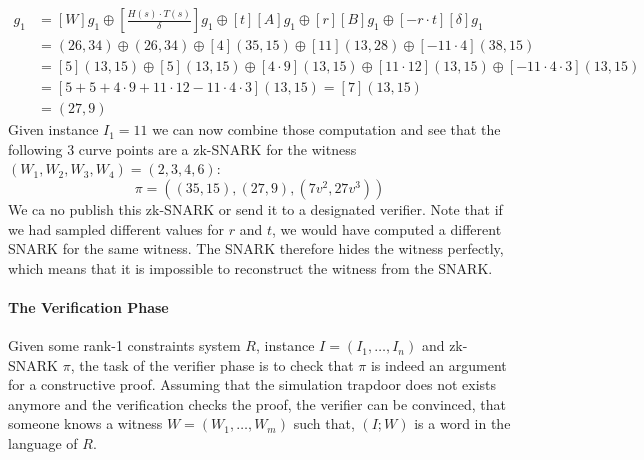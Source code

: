 \begin{example}
\begin{align*}
[C]g_1 & = [W]g_1\oplus [\frac{H(s)\cdot T(s)}{\delta}]g_1 \oplus [t][A]g_1 \oplus [r][B]g_1 \oplus [-r\cdot t][\delta]g_1\\
       & = (26,34)\oplus (26,34) \oplus [4](35,15) \oplus [11](13,28) \oplus [-11\cdot 4](38,15)\\       
       & = [5](13,15)\oplus [5](13,15) \oplus [4\cdot 9](13,15) \oplus [11\cdot 12](13,15) \oplus [-11\cdot 4\cdot 3](13,15)\\    
       & = [5+5+4\cdot 9+11\cdot 12-11\cdot 4\cdot 3](13,15)=[7](13,15)\\
       & = (27,9)
\end{align*}
Given instance $I_1=11$ we can now combine those computation and see that the following $3$ curve points are a zk-SNARK for the witness $(W_1,W_2,W_3,W_4)=(2,3,4,6)$:
$$
\pi=((35,15),(27,9),(7v^2,27v^3))
$$
We ca no publish this zk-SNARK or send it to a designated verifier. Note that if we had sampled different values for $r$ and $t$, we would have computed a different SNARK for the same witness. The SNARK therefore hides the witness perfectly, which means that it is impossible to reconstruct the witness from the SNARK.
\end{example}

\paragraph{The Verification Phase}Given some rank-1 constraints system $R$, instance $I=(I_1,\ldots, I_n)$ and zk-SNARK $\pi$, the task of the verifier phase is to check that $\pi$ is indeed an argument for a constructive proof. Assuming that the simulation trapdoor does not exists anymore and the verification checks the proof, the verifier can be convinced, that someone knows a witness $W=(W_1,\ldots,W_m)$ such that,  $(I;W)$ is a word in the language of $R$.  

